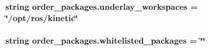\subsubsection[{\texorpdfstring{underlay\+\_\+workspaces}{underlay_workspaces}}]{\setlength{\rightskip}{0pt plus 5cm}string order\+\_\+packages.\+underlay\+\_\+workspaces = \char`\"{}/opt/ros/kinetic\char`\"{}}\hypertarget{namespaceorder__packages_a11d102ff09fd2977b9075c4c722015d2}{}\label{namespaceorder__packages_a11d102ff09fd2977b9075c4c722015d2}
\subsubsection[{\texorpdfstring{whitelisted\+\_\+packages}{whitelisted_packages}}]{\setlength{\rightskip}{0pt plus 5cm}string order\+\_\+packages.\+whitelisted\+\_\+packages = \char`\"{}\char`\"{}}\hypertarget{namespaceorder__packages_a84450a73e77dbf3689293b97dcb697a4}{}\label{namespaceorder__packages_a84450a73e77dbf3689293b97dcb697a4}
